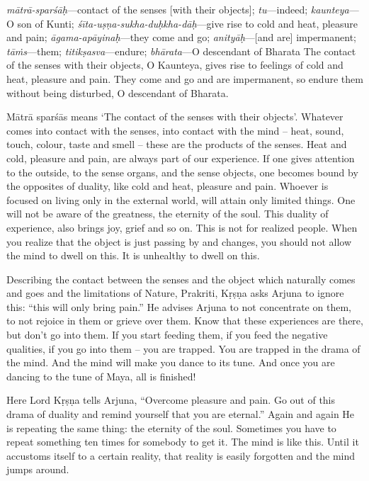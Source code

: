 {%
  \textit{mātrā-sparśāḥ}---contact of the senses [with their objects]; 
  \textit{tu}---indeed; 
  \textit{kaunteya}---O son of Kunti; 
  \textit{śīta-uṣṇa-sukha-duḥkha-dāḥ}---give rise to cold and heat, pleasure and pain; 
  \textit{āgama-apāyinaḥ}---they come and go; 
  \textit{anityāḥ}---[and are] impermanent; 
  \textit{tāṁs}---them; 
  \textit{titikṣasva}---endure; 
  \textit{bhārata}---O descendant of Bharata
}
{%
  The contact of the senses with their objects, O Kaunteya, gives rise to feelings of cold and heat, pleasure and pain. They come and go and are impermanent, so endure them without being disturbed, O descendant of Bharata.
}

Mātrā sparśās means ‘The contact of the senses with their objects’. Whatever comes into contact with the senses, into contact with the mind – heat, sound, touch, colour, taste and smell – these are the products of the senses. Heat and cold, pleasure and pain, are always part of our experience. If one gives attention to the outside, to the sense organs, and the sense objects, one becomes bound by the opposites of duality, like cold and heat, pleasure and pain. Whoever is focused on living only in the external world, will attain only limited things. One will not be aware of the greatness, the eternity of the soul. This duality of experience, also brings joy, grief and so on. This is not for realized people. When you realize that the object is just passing by and changes, you should not allow the mind to dwell on this. It is unhealthy to dwell on this.

Describing the contact between the senses and the object which naturally comes and goes and the limitations of Nature, Prakriti, Kṛṣṇa asks Arjuna to ignore this: “this will only bring pain.” He advises Arjuna to not concentrate on them, to not rejoice in them or grieve over them. Know that these experiences are there, but don’t go into them. If you start feeding them, if you feed the negative qualities, if you go into them – you are trapped. You are trapped in the drama of the mind. And the mind will make you dance to its tune. And once you are dancing to the tune of Maya, all is finished!

Here Lord Kṛṣṇa tells Arjuna, “Overcome pleasure and pain. Go out of this drama of duality and remind yourself that you are eternal.” Again and again He is repeating the same thing: the eternity of the soul. Sometimes you have to repeat something ten times for somebody to get it. The mind is like this. Until it accustoms itself to a certain reality, that reality is easily forgotten and the mind jumps around.

